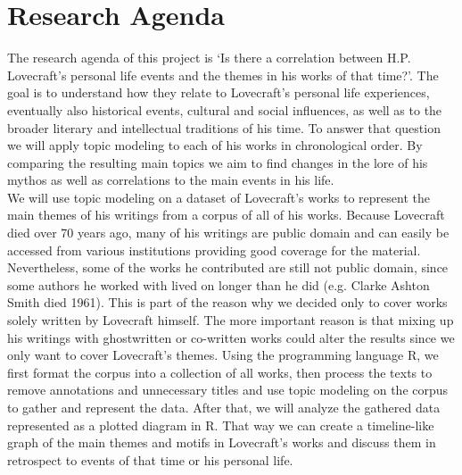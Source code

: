 \section{Research Agenda}

The research agenda of this project is ‘Is there a correlation between H.P. Lovecraft’s personal 
life events and the themes in his works of that time?’. The goal is to understand how they relate 
to Lovecraft’s personal life experiences, eventually also historical events, cultural and social 
influences, as well as to the broader literary and intellectual traditions of his time. To answer 
that question we will apply topic modeling to each of his works in chronological order. By 
comparing the resulting main topics we aim to find changes in the lore of his mythos as well 
as correlations to the main events in his life.\\

We will use topic modeling on a dataset of Lovecraft’s works to represent the main themes of his 
writings from a corpus of all of his works. Because Lovecraft died over 70 years ago, many of his 
writings are public domain and can easily be accessed from various institutions providing good 
coverage for the material. Nevertheless, some of the works he contributed are still not public 
domain, since some authors he worked with lived on longer than he did (e.g. Clarke Ashton Smith 
died 1961). This is part of the reason why we decided only to cover works solely written by 
Lovecraft himself. The more important reason is that mixing up his writings with ghostwritten or 
co-written works could alter the results since we only want to cover Lovecraft’s themes. Using the 
programming language R, we first format the corpus into a collection of all works, then process 
the texts to remove annotations and unnecessary titles and use topic modeling on the corpus to 
gather and represent the data. After that, we will analyze the gathered data represented as a 
plotted diagram in R. That way we can create a timeline-like graph of the main themes and motifs 
in Lovecraft’s works and discuss them in retrospect to events of that time or his personal life.\\

